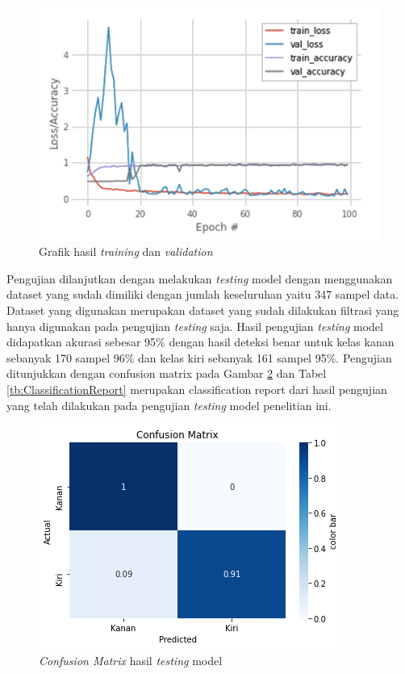\begin{figure}[H]
  \centering
  \includegraphics[scale=0.6]{gambar/hasil training dan validation w.jpg}
  \caption{Grafik hasil \emph{training} dan \emph{validation}}
  \label{fig:HasilTrainingValidation}
\end{figure}

Pengujian dilanjutkan dengan melakukan \emph{testing} model dengan menggunakan dataset yang sudah dimiliki dengan jumlah keseluruhan yaitu 347 sampel data. Dataset yang digunakan merupakan dataset yang sudah dilakukan filtrasi yang hanya digunakan pada pengujian \emph{testing} saja. Hasil pengujian \emph{testing} model didapatkan akurasi sebesar 95\% dengan hasil deteksi benar untuk kelas kanan sebanyak 170 sampel 96\% dan kelas kiri sebanyak 161 sampel 95\%. Pengujian ditunjukkan dengan confusion matrix pada Gambar \ref{fig:HasilTesting} dan Tabel \ref{tb:ClassificationReport} merupakan classification report dari hasil pengujian yang telah dilakukan pada pengujian \emph{testing} model penelitian ini.

\begin{figure}[H]
  \centering
  \includegraphics[scale=1]{gambar/cm normalized.png}
  \caption{\emph{Confusion Matrix} hasil \emph{testing} model}
  \label{fig:HasilTesting}
\end{figure}

